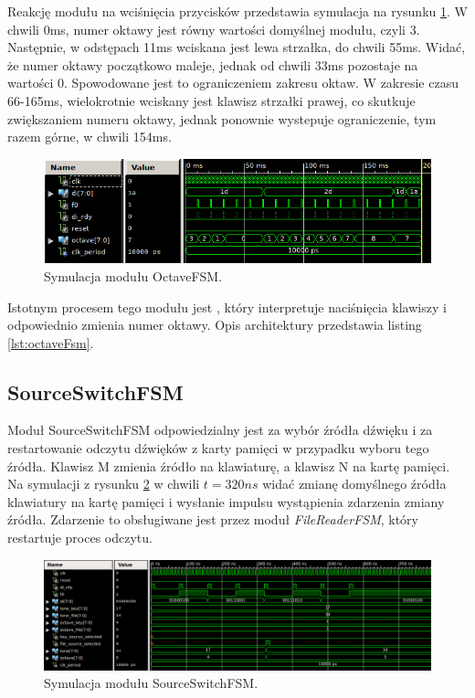 \documentclass[a4paper,12pt]{article}
\begin{document}
Reakcję modułu na wciśnięcia przycisków przedstawia symulacja na rysunku \ref{sim:octavefsm}. W chwili 0ms, numer oktawy jest równy wartości domyślnej modułu, czyli 3. Następnie, w odstępach 11ms wciskana jest lewa strzałka, do chwili 55ms. Widać, że numer oktawy początkowo maleje, jednak od chwili 33ms pozostaje na wartości 0. Spowodowane jest to ograniczeniem zakresu oktaw. W zakresie czasu 66-165ms, wielokrotnie wciskany jest klawisz strzałki prawej, co skutkuje zwiększaniem numeru oktawy, jednak ponownie wystepuje ograniczenie, tym razem górne, w chwili 154ms.

\begin{figure}[H]
  \centering
  \includegraphics[decodearray={1 0 1 0 1 0}, width=\linewidth]{images/octavefsm.png}
  \caption{Symulacja modułu OctaveFSM.}
  \label{sim:octavefsm}
\end{figure}

Istotnym procesem tego modułu jest , który interpretuje naciśnięcia klawiszy i odpowiednio zmienia numer oktawy.
Opis architektury przedstawia listing \ref{lst:octaveFsm}.


\subsection{SourceSwitchFSM}
Moduł SourceSwitchFSM odpowiedzialny jest za wybór źródła dźwięku i za restartowanie odczytu dźwięków z karty pamięci w przypadku wyboru tego źródła. Klawisz M zmienia źródło na klawiaturę, a klawisz N na kartę pamięci. Na symulacji z rysunku \ref{sim:source} w chwili $t=320ns$ widać zmianę domyślnego źródła klawiatury na kartę pamięci i wysłanie impulsu wystąpienia zdarzenia zmiany źródła. Zdarzenie to obsługiwane jest przez moduł \textit{FileReaderFSM}, który restartuje proces odczytu.
\begin{figure}[H]
  \centering
  \includegraphics[decodearray={1 0 1 0 1 0}, width=\linewidth]{images/source}
  \caption{Symulacja modułu SourceSwitchFSM.}
  \label{sim:source}
\end{figure}
\end{document}
